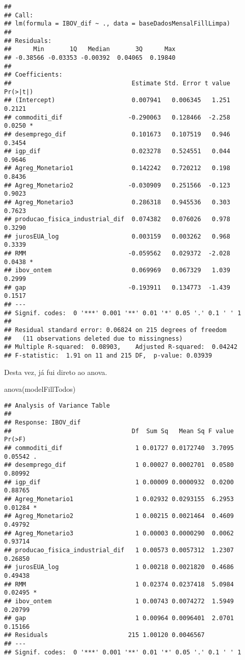 \documentclass[
]{article}
\newenvironment{Shaded}{\begin{snugshade}}{\end{snugshade}}
\newcommand{\FunctionTok}[1]{\textcolor[rgb]{0.00,0.00,0.00}{#1}}
\newcommand{\NormalTok}[1]{#1}
\begin{document}
\begin{verbatim}
## 
## Call:
## lm(formula = IBOV_dif ~ ., data = baseDadosMensalFillLimpa)
## 
## Residuals:
##      Min       1Q   Median       3Q      Max 
## -0.38566 -0.03353 -0.00392  0.04065  0.19840 
## 
## Coefficients:
##                                 Estimate Std. Error t value Pr(>|t|)  
## (Intercept)                     0.007941   0.006345   1.251   0.2121  
## commoditi_dif                  -0.290063   0.128466  -2.258   0.0250 *
## desemprego_dif                  0.101673   0.107519   0.946   0.3454  
## igp_dif                         0.023278   0.524551   0.044   0.9646  
## Agreg_Monetario1                0.142242   0.720212   0.198   0.8436  
## Agreg_Monetario2               -0.030909   0.251566  -0.123   0.9023  
## Agreg_Monetario3                0.286318   0.945536   0.303   0.7623  
## producao_fisica_industrial_dif  0.074382   0.076026   0.978   0.3290  
## jurosEUA_log                    0.003159   0.003262   0.968   0.3339  
## RMM                            -0.059562   0.029372  -2.028   0.0438 *
## ibov_ontem                      0.069969   0.067329   1.039   0.2999  
## gap                            -0.193911   0.134773  -1.439   0.1517  
## ---
## Signif. codes:  0 '***' 0.001 '**' 0.01 '*' 0.05 '.' 0.1 ' ' 1
## 
## Residual standard error: 0.06824 on 215 degrees of freedom
##   (11 observations deleted due to missingness)
## Multiple R-squared:  0.08903,    Adjusted R-squared:  0.04242 
## F-statistic:  1.91 on 11 and 215 DF,  p-value: 0.03939
\end{verbatim}

Desta vez, já fui direto ao anova.

\begin{Shaded}
\begin{Highlighting}[]
\FunctionTok{anova}\NormalTok{(modelFillTodos)}
\end{Highlighting}
\end{Shaded}

\begin{verbatim}
## Analysis of Variance Table
## 
## Response: IBOV_dif
##                                 Df  Sum Sq   Mean Sq F value  Pr(>F)  
## commoditi_dif                    1 0.01727 0.0172740  3.7095 0.05542 .
## desemprego_dif                   1 0.00027 0.0002701  0.0580 0.80992  
## igp_dif                          1 0.00009 0.0000932  0.0200 0.88765  
## Agreg_Monetario1                 1 0.02932 0.0293155  6.2953 0.01284 *
## Agreg_Monetario2                 1 0.00215 0.0021464  0.4609 0.49792  
## Agreg_Monetario3                 1 0.00003 0.0000290  0.0062 0.93714  
## producao_fisica_industrial_dif   1 0.00573 0.0057312  1.2307 0.26850  
## jurosEUA_log                     1 0.00218 0.0021820  0.4686 0.49438  
## RMM                              1 0.02374 0.0237418  5.0984 0.02495 *
## ibov_ontem                       1 0.00743 0.0074272  1.5949 0.20799  
## gap                              1 0.00964 0.0096401  2.0701 0.15166  
## Residuals                      215 1.00120 0.0046567                  
## ---
## Signif. codes:  0 '***' 0.001 '**' 0.01 '*' 0.05 '.' 0.1 ' ' 1
\end{verbatim}
\end{document}
